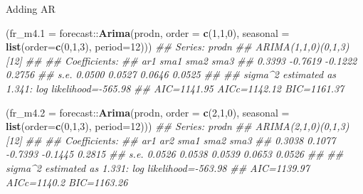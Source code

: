 \documentclass[11pt,ignorenonframetext,]{beamer}
\newenvironment{Shaded}{}{}
\newcommand{\CommentTok}[1]{\textcolor[rgb]{0.38,0.63,0.69}{\textit{#1}}}
\newcommand{\DataTypeTok}[1]{\textcolor[rgb]{0.56,0.13,0.00}{#1}}
\newcommand{\DecValTok}[1]{\textcolor[rgb]{0.25,0.63,0.44}{#1}}
\newcommand{\KeywordTok}[1]{\textcolor[rgb]{0.00,0.44,0.13}{\textbf{#1}}}
\newcommand{\NormalTok}[1]{#1}
\newcommand{\OperatorTok}[1]{\textcolor[rgb]{0.40,0.40,0.40}{#1}}
\let\oldShaded\Shaded
\let\endoldShaded\endShaded
\renewenvironment{Shaded}{\footnotesize\begin{spacing}{0.9}\oldShaded}{\endoldShaded\end{spacing}}
\let\oldverbatim\verbatim
\let\endoldverbatim\endverbatim
\newcommand{\scriptoutput}{
  \renewenvironment{Shaded}{\scriptsize\begin{spacing}{0.9}\oldShaded}{\endoldShaded\end{spacing}}
  \renewenvironment{verbatim}{\scriptsize\begin{spacing}{0.9}\oldverbatim}{\endoldverbatim\end{spacing}}
}
\begin{document}
\begin{frame}[fragile]{Adding AR}
\protect\hypertarget{adding-ar}{}

\scriptoutput

\begin{Shaded}
\begin{Highlighting}[]
\NormalTok{(}\DataTypeTok{fr_m4.1 =}\NormalTok{ forecast}\OperatorTok{::}\KeywordTok{Arima}\NormalTok{(prodn, }\DataTypeTok{order =} \KeywordTok{c}\NormalTok{(}\DecValTok{1}\NormalTok{,}\DecValTok{1}\NormalTok{,}\DecValTok{0}\NormalTok{), }
            \DataTypeTok{seasonal =} \KeywordTok{list}\NormalTok{(}\DataTypeTok{order=}\KeywordTok{c}\NormalTok{(}\DecValTok{0}\NormalTok{,}\DecValTok{1}\NormalTok{,}\DecValTok{3}\NormalTok{), }\DataTypeTok{period=}\DecValTok{12}\NormalTok{)))}
\CommentTok{## Series: prodn }
\CommentTok{## ARIMA(1,1,0)(0,1,3)[12] }
\CommentTok{## }
\CommentTok{## Coefficients:}
\CommentTok{##          ar1     sma1     sma2    sma3}
\CommentTok{##       0.3393  -0.7619  -0.1222  0.2756}
\CommentTok{## s.e.  0.0500   0.0527   0.0646  0.0525}
\CommentTok{## }
\CommentTok{## sigma^2 estimated as 1.341:  log likelihood=-565.98}
\CommentTok{## AIC=1141.95   AICc=1142.12   BIC=1161.37}
\end{Highlighting}
\end{Shaded}

\begin{Shaded}
\begin{Highlighting}[]
\NormalTok{(}\DataTypeTok{fr_m4.2 =}\NormalTok{ forecast}\OperatorTok{::}\KeywordTok{Arima}\NormalTok{(prodn, }\DataTypeTok{order =} \KeywordTok{c}\NormalTok{(}\DecValTok{2}\NormalTok{,}\DecValTok{1}\NormalTok{,}\DecValTok{0}\NormalTok{), }
            \DataTypeTok{seasonal =} \KeywordTok{list}\NormalTok{(}\DataTypeTok{order=}\KeywordTok{c}\NormalTok{(}\DecValTok{0}\NormalTok{,}\DecValTok{1}\NormalTok{,}\DecValTok{3}\NormalTok{), }\DataTypeTok{period=}\DecValTok{12}\NormalTok{)))}
\CommentTok{## Series: prodn }
\CommentTok{## ARIMA(2,1,0)(0,1,3)[12] }
\CommentTok{## }
\CommentTok{## Coefficients:}
\CommentTok{##          ar1     ar2     sma1     sma2    sma3}
\CommentTok{##       0.3038  0.1077  -0.7393  -0.1445  0.2815}
\CommentTok{## s.e.  0.0526  0.0538   0.0539   0.0653  0.0526}
\CommentTok{## }
\CommentTok{## sigma^2 estimated as 1.331:  log likelihood=-563.98}
\CommentTok{## AIC=1139.97   AICc=1140.2   BIC=1163.26}
\end{Highlighting}
\end{Shaded}

\end{frame}
\end{document}
